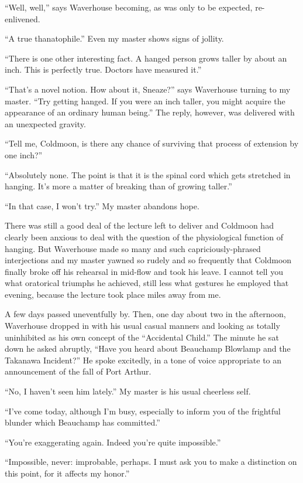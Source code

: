 \documentclass[12pt, openright]{book}
\begin{document}
``Well, well,'' says Waverhouse becoming, as was only to be expected,
re-enlivened.

``A true thanatophile.'' Even my master shows signs of jollity.

``There is one other interesting fact. A hanged person grows taller by
about an inch. This is perfectly true. Doctors have measured it.''

``That's a novel notion. How about it, Sneaze?'' says Waverhouse turning
to my master. ``Try getting hanged. If you were an inch taller, you
might acquire the appearance of an ordinary human being.'' The reply,
however, was delivered with an unexpected gravity.

``Tell me, Coldmoon, is there any chance of surviving that process of
extension by one inch?''

``Absolutely none. The point is that it is the spinal cord which gets
stretched in hanging. It's more a matter of breaking than of growing
taller.''

``In that case, I won't try.'' My master abandons hope.

There was still a good deal of the lecture left to deliver and Coldmoon
had clearly been anxious to deal with the question of the physiological
function of hanging. But Waverhouse made so many and such
capriciously-phrased interjections and my master yawned so rudely and so
frequently that Coldmoon finally broke off his rehearsal in mid-flow and
took his leave. I cannot tell you what oratorical triumphs he achieved,
still less what gestures he employed that evening, because the lecture
took place miles away from me.

A few days passed uneventfully by. Then, one day about two in the
afternoon, Waverhouse dropped in with his usual casual manners and
looking as totally uninhibited as his own concept of the ``Accidental
Child.'' The minute he sat down he asked abruptly, ``Have you heard
about Beauchamp Blowlamp and the Takanawa Incident?'' He spoke
excitedly, in a tone of voice appropriate to an announcement of the fall
of Port Arthur.

``No, I haven't seen him lately.'' My master is his usual cheerless
self.

``I've come today, although I'm busy, especially to inform you of the
frightful blunder which Beauchamp has committed.''

``You're exaggerating again. Indeed you're quite impossible.''

``Impossible, never: improbable, perhaps. I must ask you to make a
distinction on this point, for it affects my honor.''
\end{document}
